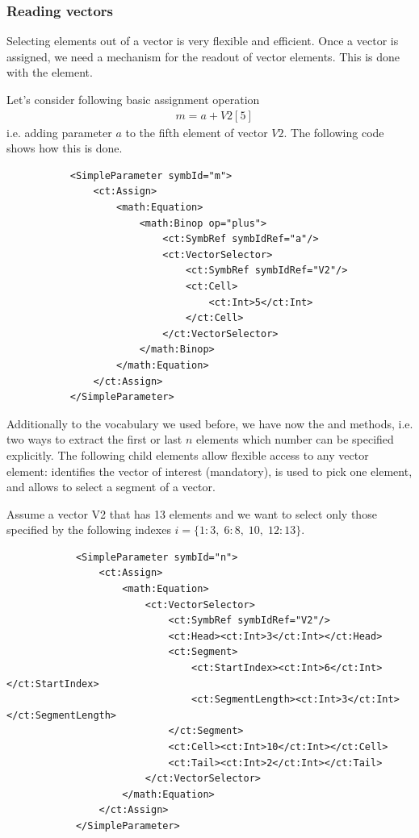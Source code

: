 \subsubsection{Reading vectors}
Selecting elements out of a vector is very flexible and efficient. 
Once a vector is assigned, we need a mechanism for the readout of vector
elements. This is done with the  element. 

Let's consider following basic assignment operation
\begin{align}
	& m = a + V2[5] \nonumber
\end{align}
i.e. adding parameter $a$ to the fifth element of vector $V2$. 
The following code shows how this is done. 

\lstset{language=XML}
\begin{lstlisting}
           <SimpleParameter symbId="m">
               <ct:Assign>
                   <math:Equation>
                       <math:Binop op="plus">
                           <ct:SymbRef symbIdRef="a"/>
                           <ct:VectorSelector>
                               <ct:SymbRef symbIdRef="V2"/>
                               <ct:Cell>
                                   <ct:Int>5</ct:Int>
                               </ct:Cell>
                           </ct:VectorSelector>
                       </math:Binop>
                   </math:Equation>
               </ct:Assign>
           </SimpleParameter>
\end{lstlisting}

Additionally to the vocabulary we used before, we have now the  and  
methods, i.e. two ways to extract the first or last $n$ elements which number can be specified
explicitly. The following child elements allow flexible access to any vector element: 
 identifies the vector of interest (mandatory), 
 is used to pick one element, and
 allows to select a segment of a vector.


Assume a vector V2 that has 13 elements and we want to select only those specified by the
following indexes $i=\{1:3,\;6:8,\;10,\;12:13\}.$
\lstset{language=XML}
\begin{lstlisting}
            <SimpleParameter symbId="n">
                <ct:Assign>
                    <math:Equation>
                        <ct:VectorSelector>
                            <ct:SymbRef symbIdRef="V2"/>
                            <ct:Head><ct:Int>3</ct:Int></ct:Head>
                            <ct:Segment>
                                <ct:StartIndex><ct:Int>6</ct:Int></ct:StartIndex>
                                <ct:SegmentLength><ct:Int>3</ct:Int></ct:SegmentLength>
                            </ct:Segment>
                            <ct:Cell><ct:Int>10</ct:Int></ct:Cell>
                            <ct:Tail><ct:Int>2</ct:Int></ct:Tail>
                        </ct:VectorSelector>
                    </math:Equation>
                </ct:Assign>
            </SimpleParameter>
\end{lstlisting}



